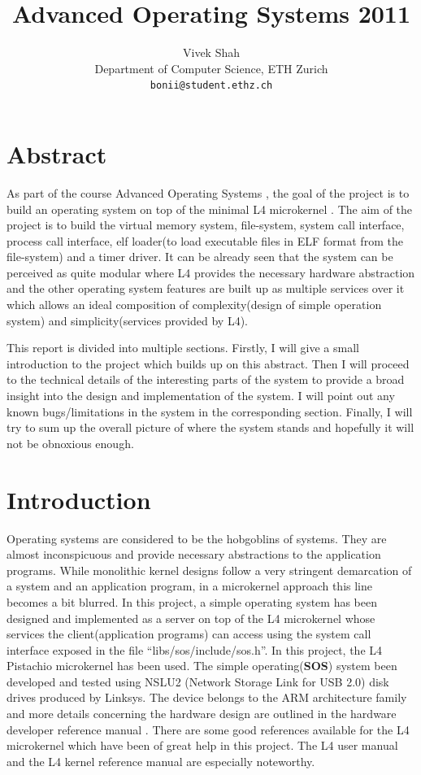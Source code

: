 \documentclass[a4paper, 11pt]{article}
\title{Advanced Operating Systems 2011}
\author{Vivek Shah \\Department of Computer Science, ETH Zurich \\
\texttt{bonii@student.ethz.ch}}
\begin{document}
    
\maketitle
\newpage
\tableofcontents
\newpage

\section{Abstract}
As part of the course Advanced Operating Systems \cite{os-project},
the goal of the project is to build an operating system on top of the
minimal L4 microkernel \cite{l4}. The aim of the project is to build
the virtual memory system, file-system, system call interface, process
call interface, elf loader(to load executable files in ELF \cite{elf}
format from
the file-system) and a timer driver. It can be already seen that the
system can be perceived as quite modular where L4 provides the
necessary hardware abstraction and the other operating system features
are built up as multiple services over it which allows an ideal
composition of complexity(design of simple operation system) and
simplicity(services provided by L4). 

This report is divided into multiple sections. Firstly, I will give a
small introduction to the project which builds up on this
abstract. Then I will proceed to the technical details of the
interesting parts of the system to provide a broad insight into the
design and implementation of the system. I will point out any known
bugs/limitations in the system in the corresponding section. Finally,
I will try to sum up the overall picture of where the system stands
and hopefully it will not be obnoxious enough. 

\newpage
\section{Introduction}
Operating systems are considered to be the hobgoblins of systems. They
are almost inconspicuous and provide necessary abstractions to the application
programs. While monolithic kernel designs follow a very stringent
demarcation of a system and an application program, in a microkernel
approach this line becomes a bit blurred. In this project, a simple
operating system has been designed and implemented as a server on top
of the L4 microkernel whose services the client(application programs)
can access using the system call interface exposed in the file
``libs/sos/include/sos.h''.  In this project, the L4 Pistachio microkernel
\cite{l4-pistachio} has been used. The simple operating({\bf SOS}) system been
developed and tested using NSLU2 (Network Storage Link for USB 2.0)
disk drives \cite{slug} produced by Linksys. The device belongs to the
ARM architecture family \cite{arm-manual} and more details concerning
the hardware design are outlined in the hardware developer reference manual 
\cite{slug-manual}. There are some good references available for the
L4 microkernel which have been of great help in this project. The L4
user manual \cite{l4-usermanual} and the L4 kernel reference manual
\cite{l4-manual} are especially noteworthy.
\end{document}
